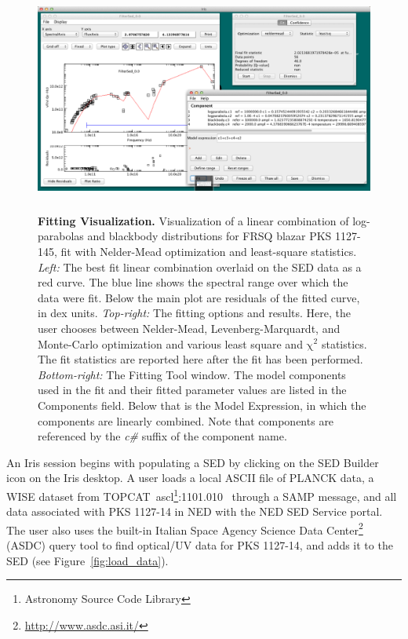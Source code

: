 \documentclass[preprint,authoryear,5p]{elsarticle}
\begin{document}
\begin{figure} \centering
\includegraphics[height=2.95in,width=5.3in]{fitting-1.pdf}
\caption{\textbf{Fitting Visualization.}  Visualization of a linear combination of
log-parabolas and blackbody distributions for FRSQ blazar PKS 1127-145, fit with
Nelder-Mead optimization and least-square statistics. \textit{Left:} The best fit
linear combination overlaid on the SED data as a red curve. The blue line shows
the spectral range over which the data were fit. Below the main plot are
residuals of the fitted curve, in dex units. \textit{Top-right:} The fitting
options and results. Here, the user chooses between Nelder-Mead,
Levenberg-Marquardt, and Monte-Carlo \citep[Differential Evolution, ][]{Storn:1997:DEN:596061.596146}
optimization and various least square and
$\mathrm{\chi}^{2}$ statistics. The fit statistics are reported here after the
fit has been performed. \textit{Bottom-right:} The Fitting Tool window. The
model components used in the fit and their fitted parameter values are listed in
the Components field. Below that is the Model Expression, in which the
components are linearly combined. Note that components are referenced by the
\textit{c\#} suffix of the component name.} \label{fig:fitting1} \end{figure}

\begin{sloppypar}
An Iris session begins with populating a SED by clicking on the SED Builder icon on the
Iris desktop. A user loads a local ASCII file of
PLANCK data, a WISE dataset from TOPCAT~ascl\footnote{Astronomy Source Code Library}:1101.010~\citep{2005ASPC..347...29T} 
through a SAMP message, and all data associated with PKS 1127-14 in NED with the NED SED
Service portal. The user also uses the built-in Italian Space Agency Science Data
Center\footnote{\url{http://www.asdc.asi.it/}} (ASDC) query tool to find
optical/UV data for PKS 1127-14, and adds it to the SED (see
Figure~\ref{fig:load_data}).
\end{sloppypar}
\end{document}

